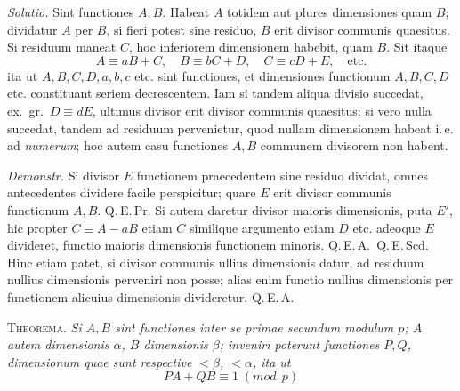 \emph{Solutio.} Sint functiones $A,B$. Habeat $A$ totidem aut plures dimensiones quam $B$; dividatur $A$ per $B$, si fieri potest sine residuo, $B$ erit divisor communis quaesitus. Si residuum maneat $C$, hoc inferiorem dimensionem habebit, quam $B$. Sit itaque
\[
A\equiv aB+C,\quad B\equiv bC+D,\quad C\equiv cD+E,\quad\text{etc.}
\]
ita ut $A,B,C,D,a,b,c$ etc. sint functiones, et dimensiones functionum $A,B,C,D$ etc. constituant seriem decrescentem. Iam si tandem aliqua divisio succedat, ex.\ gr.\ $D\equiv dE$, ultimus divisor erit divisor communis quaesitus; si vero nulla succedat, tandem ad residuum pervenietur, quod nullam dimensionem
habeat i.\,e. ad \emph{numerum}; hoc autem casu functiones $A,B$ communem divisorem non habent.

\emph{Demonstr.} Si divisor $E$ functionem praecedentem sine residuo dividat, omnes antecedentes dividere facile perspicitur; quare $E$ erit divisor communis functionum $A,B$. Q.\,E.\,Pr. Si autem daretur divisor maioris dimensionis, puta $E'$, hic propter $C\equiv A-aB$ etiam $C$ similique argumento etiam $D$ etc. adeoque $E$ divideret, functio maioris dimensionis functionem minoris. Q.\,E.\,A.\ Q.\,E.\,Scd. Hinc etiam patet, si divisor communis ullius dimensionis datur, ad residuum nullius dimensionis perveniri non posse; alias enim functio nullius dimensionis per functionem alicuius dimensionis divideretur. Q.\,E.\,A.

\textsc{Theorema.} \emph{Si $A,B$ sint functiones inter se primae secundum modulum $p$; $A$ autem dimensionis $\alpha$, $B$ dimensionis $\beta$; inveniri poterunt functiones $P,Q$, dimensionum quae sunt respective $<\beta$, $<\alpha$, ita ut}
\[
PA+QB\equiv1\;(\mathit{mod.}\,p)
\]

